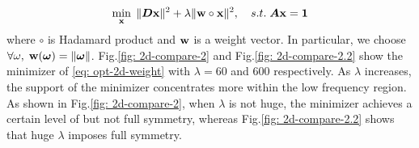 \begin{align}
\min_{\mathbf{x}}\; \Vert\boldsymbol{ D}\mathbf{x}\Vert^2 + \lambda\Vert \mathbf{w}\circ\mathbf{x}\Vert^2,\quad s.t. \; \boldsymbol{A}\mathbf{x} = \mathbf{1} \label{eq: opt-2d-weight}
\end{align} 
where $\circ$ is Hadamard product and $\mathbf{w}$ is a weight vector. In particular, we choose $\forall \omega, \; \mathbf{w}(\boldsymbol{\omega}) = \Vert\boldsymbol{\omega}\Vert$. Fig.\ref{fig: 2d-compare-2} and Fig.\ref{fig: 2d-compare-2.2} show the minimizer of \eqref{eq: opt-2d-weight} with $\lambda=60$ and $600$ respectively. As $\lambda$ increases, the support of the minimizer concentrates more within the low frequency region. As shown in Fig.\ref{fig: 2d-compare-2}, when $\lambda$ is not huge, the minimizer achieves a certain level of but not full symmetry, whereas Fig.\ref{fig: 2d-compare-2.2} shows that huge $\lambda$ imposes full symmetry.

